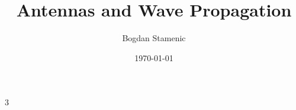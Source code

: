 

\newcommand{\FormelsammlungTitel}{Antennas and Wave Propagation}
\newcommand{\FormelsammlungAutor}{Bogdan Stamenic}
\setcounter{tocdepth}{2} %


	\title{\FormelsammlungTitel}
	\author{\FormelsammlungAutor}
	\date{\today}
	\begin{multicols}{3}
        {\small%
			\maketitle
			\tableofcontents
        
        
        
        
        
        
        
        
        }
	\end{multicols}

